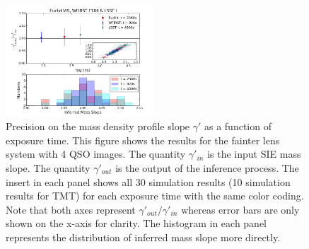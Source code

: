 \documentclass[a4paper,11pt]{article}
\begin{document}
{\begin{figure}
\begin{center}
\includegraphics[width=0.49\textwidth]{figures/gamma_hist_135949_4QSO_EWL.png}
\end{center}
\caption{Precision on the mass density profile slope $\gamma'$ as a function of exposure time.  This figure shows the results for the fainter lens system with 4 QSO images. The quantity $\gamma'_{in}$ is the input SIE mass slope. The quantity $\gamma'_{out}$ is the output of the inference process.
The insert in each panel shows all 30 simulation results (10 simulation results for TMT) for each exposure time with the same color coding. Note that both axes represent $\gamma'_{out}/\gamma'_{in}$ whereas error bars are only shown on the x-axis for clarity.
The histogram in each panel represents the distribution of inferred mass slope more directly.}
\label{fig:gamma_fainter_4QSOimages}
\end{figure}


}
\end{document}
